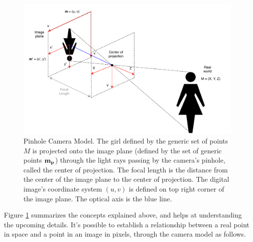 \begin{figure}[ht]
	\centering
	\includegraphics[width=\textwidth]{images/cameraconcepts.pdf}
	\caption[Pinhole Camera Model]{Pinhole Camera Model. The girl defined by the generic set of points $M$ is projected onto the image plane (defined by the set of generic points $\bf m_{p}$) through the light rays passing by the camera's pinhole, called the center of projection. The focal length is the distance from the center of the image plane to the center of projection. The digital image's coordinate system $(u, v)$ is defined on top right corner of the image plane. The optical axis is the blue line.}
	\label{cha2:sec2:fig:camera_concepts}
\end{figure}

Figure \ref{cha2:sec2:fig:camera_concepts} summarizes the concepts explained above, and helps at understanding the upcoming details. It's possible to establish a relationship between a real point in space and a point in an image in pixels, through the camera model as follows.

